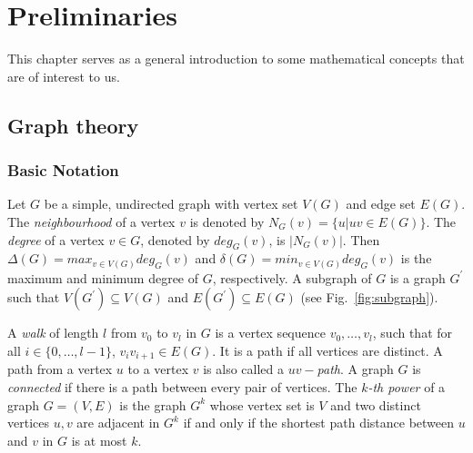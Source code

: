 \chapter{Preliminaries}
\label{chap:preliminaries}
This chapter serves as a general introduction to some mathematical concepts that are of interest to us.
\section{Graph theory}

\subsection{Basic Notation}
Let $G$ be a simple, undirected graph with vertex set $V(G)$ and edge set $E(G)$. The \textit{neighbourhood} of a vertex $v$ is denoted by
$N_{G}(v) = \{u | uv \in E(G)\}$. The \textit{degree} of a vertex $v \in G$, denoted by $deg_{G}(v)$, is $|N_{G}(v)|$. Then
$\Delta(G) = max_{v \in V(G)} deg_{G}(v)$ and $\delta(G) = min_{v \in V(G)} deg_{G}(v) $ is the maximum and minimum degree of $G$, respectively.
A subgraph of $G$ is a graph $G^{'}$ such that $V(G^{'}) \subseteq V(G)$ and $E(G^{'}) \subseteq E(G)$ (see Fig.~\ref{fig:subgraph}).

A \textit{walk} of length $l$ from $v_0$ to $v_l$ in $G$ is a vertex sequence $v_0, \dots ,v_{l}$, such that for all
$i \in \{0,\dots,l-1\}$, $v_{i}v_{i+1} \in E(G)$. It is a path if all vertices are distinct. A path from a vertex $u$ to a vertex $v$ is also
called a \textit{$uv-$path}. A graph $G$ is \textit{connected} if there is a path between every pair of vertices. The \textit{$k$-th power} of
a graph $G = (V,E)$ is the graph $G^{k}$ whose vertex set is $V$ and two distinct vertices $u,v$ are adjacent in $G^{k}$ if and only if the
shortest path distance between $u$ and $v$ in $G$ is at most $k$.

